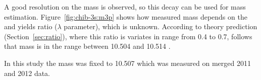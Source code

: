 


A good resolution on the \chiboneThreeP mass is observed, so this decay can be
used for \chiboneThreeP mass estimation. Figure~\ref{fig:chib-3s:m3p} shows
how \chiboneThreeP measured mass depends on the \chiboneThreeP and \chibtwoThreeP 
yields ratio ($\lambda$ parameter), which is unknown. 
According to theory prediction (Section~\ref{sec:ratio}), where this ratio is
variates in range from 0.4 to 0.7, follows that \chiboneThreeP mass is in 
the range between 10.504 and 10.514 \gevcc.




In this study the mass was fixed to 10.507 \gevcc which was measured on merged 2011 and 2012 data.





